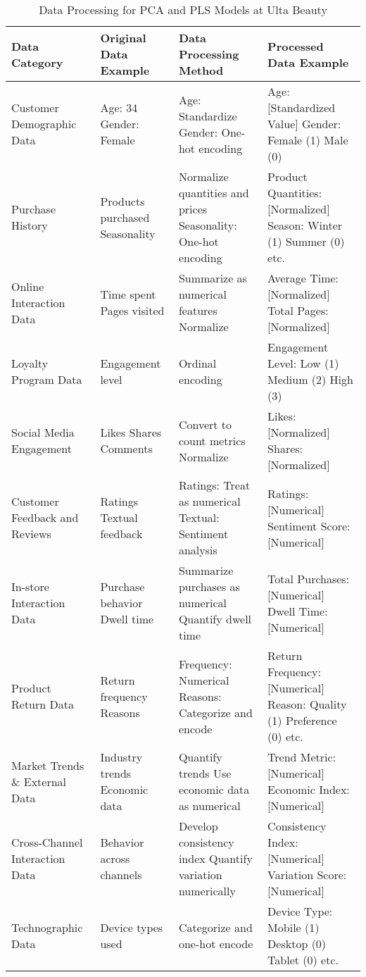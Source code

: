 \documentclass{article}
\begin{document}
\begin{table}[H]
\centering
\begin{tabular}{|p{3.5cm}|p{3.5cm}|p{3.5cm}|p{3.5cm}|}
\hline
\textbf{Data Category} & \textbf{Original Data Example} & \textbf{Data Processing Method} & \textbf{Processed Data Example} \\
\hline
Customer Demographic Data & Age: 34 Gender: Female & Age: Standardize Gender: One-hot encoding & Age: [Standardized Value] Gender: Female (1) Male (0) \\
\hline
Purchase History & Products purchased Seasonality & Normalize quantities and prices Seasonality: One-hot encoding & Product Quantities: [Normalized] Season: Winter (1) Summer (0) etc. \\
\hline
Online Interaction Data & Time spent Pages visited & Summarize as numerical features Normalize & Average Time: [Normalized] Total Pages: [Normalized] \\
\hline
Loyalty Program Data & Engagement level & Ordinal encoding & Engagement Level: Low (1) Medium (2) High (3) \\
\hline
Social Media Engagement & Likes Shares Comments & Convert to count metrics Normalize & Likes: [Normalized] Shares: [Normalized] \\
\hline
Customer Feedback and Reviews & Ratings Textual feedback & Ratings: Treat as numerical Textual: Sentiment analysis & Ratings: [Numerical] Sentiment Score: [Numerical] \\
\hline
In-store Interaction Data & Purchase behavior Dwell time & Summarize purchases as numerical Quantify dwell time & Total Purchases: [Numerical] Dwell Time: [Numerical] \\
\hline
Product Return Data & Return frequency Reasons & Frequency: Numerical Reasons: Categorize and encode & Return Frequency: [Numerical] Reason: Quality (1) Preference (0) etc. \\
\hline
Market Trends \& External Data & Industry trends Economic data & Quantify trends Use economic data as numerical & Trend Metric: [Numerical] Economic Index: [Numerical] \\
\hline
Cross-Channel Interaction Data & Behavior across channels & Develop consistency index Quantify variation numerically & Consistency Index: [Numerical] Variation Score: [Numerical] \\
\hline
Technographic Data & Device types used & Categorize and one-hot encode & Device Type: Mobile (1) Desktop (0) Tablet (0) etc. \\
\hline
\end{tabular}
\caption{Data Processing for PCA and PLS Models at Ulta Beauty}
\label{table:data_processing}
\end{table}
\end{document}

